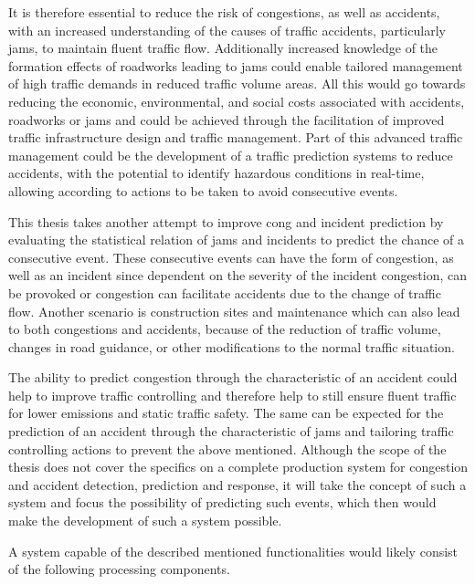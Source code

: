\documentclass[a4paper,12pt]{report}
\begin{document}
\par It is therefore essential to reduce the risk of congestions, as well as accidents, with an increased understanding of the causes of traffic accidents, particularly \glspl{jam}, to maintain fluent traffic flow. Additionally increased knowledge of the formation effects of roadworks leading to jams could enable tailored management of high traffic demands in reduced traffic volume areas. All this would go towards reducing the economic, environmental, and social costs associated with accidents, roadworks or \glspl{jam} and could be achieved through the facilitation of improved traffic infrastructure design and traffic management. Part of this advanced traffic management could be the development of a traffic prediction systems to reduce accidents, with the potential to identify hazardous conditions in real-time, allowing according to actions to be taken to avoid consecutive events. \cite{RetallackOstendorf2019} 
\newline
\par This thesis takes another attempt to improve \gls{cong} and incident prediction by evaluating the statistical relation of \glspl{jam} and incidents to predict the chance of a consecutive event. These consecutive events can have the form of congestion, as well as an incident since dependent on the severity of the incident congestion, can be provoked or congestion can facilitate accidents due to the change of traffic flow. Another scenario is construction sites and maintenance which can also lead to both congestions and accidents, because of the reduction of traffic volume, changes in road guidance, or other modifications to the normal traffic situation.  


\par The ability to predict congestion through the characteristic of an accident could help to improve traffic controlling and therefore help to still ensure fluent traffic for lower emissions and static traffic safety. The same can be expected for the prediction of an accident through the characteristic of jams and tailoring traffic controlling actions to prevent the above mentioned. Although the scope of the thesis does not cover the specifics on a complete production system for congestion and accident detection, prediction and response, it will take the concept of such a system and focus the possibility of predicting such events, which then would make the development of such a system possible. 
\par A system capable of the described mentioned functionalities would likely consist of the following processing components.
\end{document}
